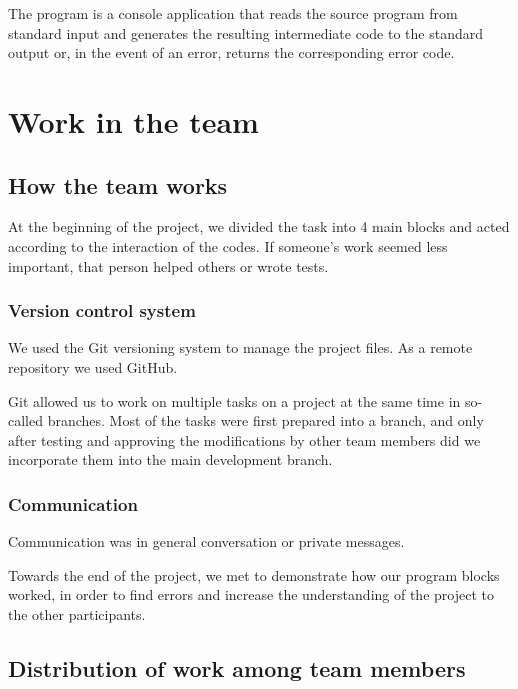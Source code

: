 \documentclass[a4paper, 11pt]{article}
\begin{document}
    The program is a console application that reads the source program from standard input and generates
    the resulting intermediate code to the standard output or, in the event of an error, returns the corresponding error code.



	\section{Work in the team}

	\subsection{How the team works}

    At the beginning of the project, we divided the task into 4 main blocks and acted according to the interaction of the codes. If someone's work seemed less important, that person helped others or wrote tests.
	\subsubsection{Version control system}

	We used the Git versioning system to manage the project files. As a remote repository we used \mbox{GitHub}.

	Git allowed us to work on multiple tasks on a project at the same time in so-called branches. Most of the tasks were first prepared
	into a branch, and only after testing and approving the modifications by other team members did we incorporate them into the main
	development branch.

	\subsubsection{Communication}

	Communication was in general conversation or private messages.

	Towards the end of the project, we met to demonstrate how our program blocks worked, in order to find errors and increase the understanding of the project to the other participants.


	\subsection{Distribution of work among team members}
\end{document}
